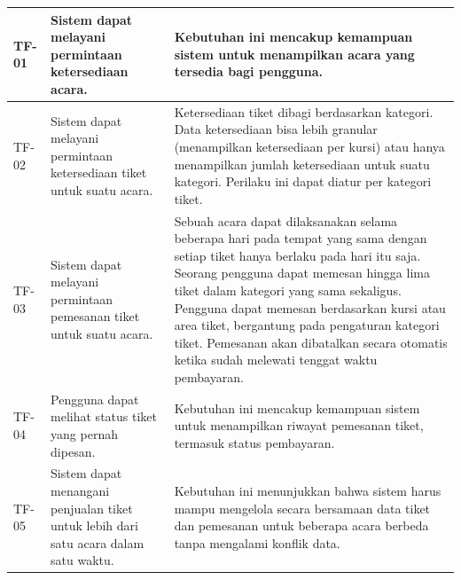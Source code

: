 \begin{longtable}{|l|p{}|p{}|}
    \endfoot
    \hline
    \endlastfoot
    \hline
    TF-01       & Sistem dapat melayani permintaan ketersediaan acara.                                 & Kebutuhan ini mencakup kemampuan sistem untuk menampilkan acara yang tersedia bagi pengguna.                                                                                                                                                                                                                                                                                                                         \\
    \hline
    TF-02       & Sistem dapat melayani permintaan ketersediaan tiket untuk suatu acara.               & Ketersediaan tiket dibagi berdasarkan kategori. Data ketersediaan bisa lebih granular (menampilkan ketersediaan per kursi) atau hanya menampilkan jumlah ketersediaan untuk suatu kategori. Perilaku ini dapat diatur per kategori tiket.                                                                                                                                                                            \\
    \hline
    TF-03       & Sistem dapat melayani permintaan pemesanan tiket untuk suatu acara.                  & Sebuah acara dapat dilaksanakan selama beberapa hari pada tempat yang sama dengan setiap tiket hanya berlaku pada hari itu saja. Seorang pengguna dapat memesan hingga lima tiket dalam kategori yang sama sekaligus. Pengguna dapat memesan berdasarkan kursi atau area tiket, bergantung pada pengaturan kategori tiket. Pemesanan akan dibatalkan secara otomatis ketika sudah melewati tenggat waktu pembayaran. \\
    \hline
    TF-04       & Pengguna dapat melihat status tiket yang pernah dipesan.                             & Kebutuhan ini mencakup kemampuan sistem untuk menampilkan riwayat pemesanan tiket, termasuk status pembayaran.                                                                                                                                                                                                                                                                                                       \\
    \hline
    TF-05       & Sistem dapat menangani penjualan tiket untuk lebih dari satu acara dalam satu waktu. & Kebutuhan ini menunjukkan bahwa sistem harus mampu mengelola secara bersamaan data tiket dan pemesanan untuk beberapa acara berbeda tanpa mengalami konflik data.                                                                                                                                                                                                                                                    \\
\end{longtable}
\endgroup
\pagebreak

